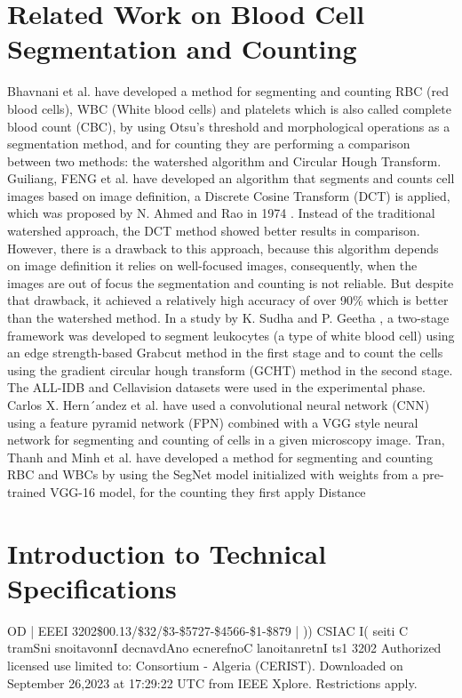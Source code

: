 \documentclass[conference]{IEEEtran}
\begin{document}
\section{Related Work on Blood Cell Segmentation and Counting}
Bhavnani et al. \cite{ref2} have developed a method for segmenting and counting RBC (red blood cells), WBC (White blood cells) and platelets which is also called complete blood count (CBC), by using Otsu’s threshold and morphological operations as a segmentation method, and for counting they are performing a comparison between two methods: the watershed algorithm and Circular Hough Transform.
Guiliang, FENG et al. \cite{ref3} have developed an algorithm that segments and counts cell images based on image definition, a Discrete Cosine Transform (DCT) is applied, which was proposed by N. Ahmed and Rao in 1974 \cite{ref4}. Instead of the traditional watershed approach, the DCT method showed better results in comparison. However, there is a drawback to this approach, because this algorithm depends on image definition it relies on well-focused images, consequently, when the images are out of focus the segmentation and counting is not reliable. But despite that drawback, it achieved a relatively high accuracy of over 90\% which is better than the watershed method. In a study by K. Sudha and P. Geetha \cite{ref5}, a two-stage framework was developed to segment leukocytes (a type of white blood cell) using an edge strength-based Grabcut method in the first stage and to count the cells using the gradient circular hough transform (GCHT) method in the second stage. The ALL-IDB \cite{ref6} and Cellavision \cite{ref7} datasets were used in the experimental phase.
Carlos X. Hern´andez et al. \cite{ref8} have used a convolutional neural network (CNN) using a feature pyramid network (FPN) combined with a VGG style neural network for segmenting and counting of cells in a given microscopy image.
Tran, Thanh and Minh et al. \cite{ref9} have developed a method for segmenting and counting RBC and WBCs by using the SegNet model initialized with weights from a pre-trained VGG-16 model, for the counting they first apply Distance

\section{Introduction to Technical Specifications}
OD
|
EEEI
3202\$00.13/\$32/\$3-\$5727-\$4566-\$1-\$879
|
))
CSIAC
I(
seiti
C
tramSni
snoitavonnI
decnavdAno
ecnerefnoC
lanoitanretnI
ts1
3202
Authorized licensed use limited to: Consortium - Algeria (CERIST). Downloaded on September 26,2023 at 17:29:22 UTC from IEEE Xplore. Restrictions apply.
\end{document}
